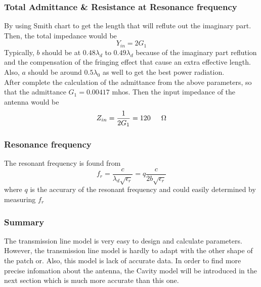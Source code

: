 \documentclass[11pt,a4paper]{article}
\begin{document}
      \subsubsection{Total Admittance \& Resistance at Resonance frequency}
        \indent By using Smith chart to get the length that will reflute out the imaginary part. Then, the total impedance would be
        \begin{equation}
          Y_{in} = 2G_1
        \end{equation}
        \indent Typically, $b$ should be at $0.48\lambda_d$ to $0.49\lambda_d$ because of the imaginary part reflution
                and the compensation of the fringing effect that cause an extra effective length. Also, $a$ should be around
                $0.5\lambda_0$ as well to get the best power radiation.  \\[1ex]
        \indent After complete the calculation of the admittance from the above parameters, so that the admittance
                $G_1 = 0.00417$ mhos. Then the input impedance of the antenna would be
        \begin{equation}
          Z_{in} = \frac{1}{2G_1} = 120 \indent \Omega
        \end{equation}

      \subsubsection{Resonance frequency}
        \indent The resonant frequency is found from
        \begin{equation}
          f_r = \frac{c}{\lambda_d\sqrt{\epsilon_r}} = q\frac{c}{2b\sqrt{\epsilon_r}}
        \end{equation}
        \indent where $q$ is the accurary of the resonant frequency and could easily determined by measuring $f_r$ \cite{CaM:81}
      
        \subsubsection{Summary}
        \indent The transmission line model is very easy to design and calculate parameters. However, the transmission line
                model is hardly to adapt with the other shape of the patch or. Also, this model is lack of accurate data.
                In order to find more precise infomation about the antenna, the Cavity model will be introduced 
                in the next section which is much more accurate than this one.\cite{CaM:81,NoK:05}
  \newpage
\end{document}
